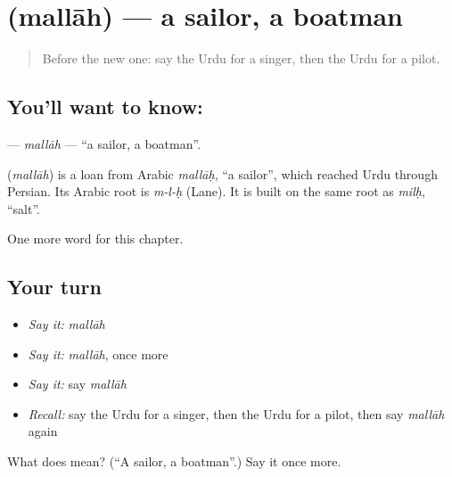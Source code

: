 \section[\texorpdfstring{\ur{ملاح} (mallāh)}{ملاح (mallāh)}]{ (mallāh) — a sailor, a boatman}

\label{lesson:UR-C178-mallah}



\begin{quote}
Before the new one: say the Urdu for a singer, then the Urdu for a pilot.
\end{quote}

\subsection*{You'll want to know: }
\textbf{} — \emph{mallāh} — \textquotedblleft{}a sailor, a boatman\textquotedblright{}.

\begin{cousinweb}
\textbf{} (\emph{mallāh}) is a loan from Arabic \emph{mallāḥ}, \textquotedblleft{}a sailor\textquotedblright{}, which reached Urdu through Persian. Its Arabic root is \emph{m-l-ḥ} (Lane). It is built on the same root as \emph{milḥ}, \textquotedblleft{}salt\textquotedblright{}.
\end{cousinweb}

\begin{grammarlens}[title={What you've built}]
One more word for this chapter.
\end{grammarlens}

\subsection*{Your turn}
\begin{itemize}
\raggedright
  \item \emph{Say it:} \emph{mallāh}
  \item \emph{Say it:} \emph{mallāh}, once more
  \item \emph{Say it:} say \emph{mallāh}
  \item \emph{Recall:} say the Urdu for a singer, then the Urdu for a pilot, then say \emph{mallāh} again
\end{itemize}

\begin{tcolorbox}[breakable,colback=teal!4,colframe=teal!35!black,title={Before you move on}]
What does  mean? (\textquotedblleft{}A sailor, a boatman\textquotedblright{}.) Say it once more.
\end{tcolorbox}
